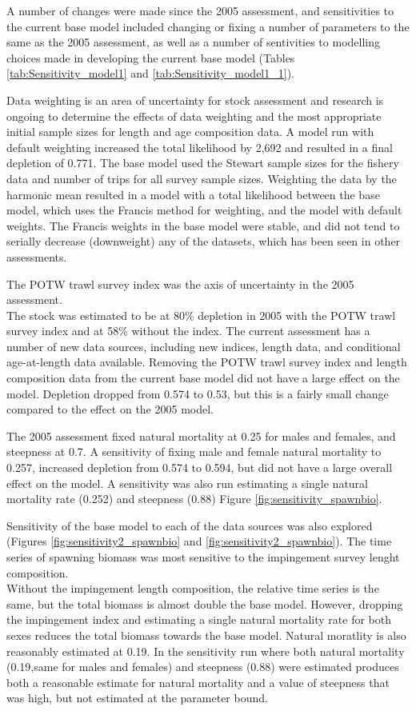 \documentclass[12pt,]{article}
\begin{document}
A number of changes were made since the 2005 assessment, and
sensitivities to the current base model included changing or fixing a
number of parameters to the same as the 2005 assessment, as well as a
number of sentivities to modelling choices made in developing the
current base model (Tables \ref{tab:Sensitivity_model1} and
\ref{tab:Sensitivity_model1_1}).

Data weighting is an area of uncertainty for stock assessment and
research is ongoing to determine the effects of data weighting and the
most appropriate initial sample sizes for length and age composition
data. A model run with default weighting increased the total likelihood
by 2,692 and resulted in a final depletion of 0.771. The base model used
the Stewart sample sizes for the fishery data and number of trips for
all survey sample sizes. Weighting the data by the harmonic mean
resulted in a model with a total likelihood between the base model,
which uses the Francis method for weighting, and the model with default
weights. The Francis weights in the base model were stable, and did not
tend to serially decrease (downweight) any of the datasets, which has
been seen in other assessments.

The POTW trawl survey index was the axis of uncertainty in the 2005
assessment.\\
The stock was estimated to be at 80\% depletion in 2005 with the POTW
trawl survey index and at 58\% without the index. The current assessment
has a number of new data sources, including new indices, length data,
and conditional age-at-length data available. Removing the POTW trawl
survey index and length composition data from the current base model did
not have a large effect on the model. Depletion dropped from 0.574 to
0.53, but this is a fairly small change compared to the effect on the
2005 model.

The 2005 assessment fixed natural mortality at 0.25 for males and
females, and steepness at 0.7. A sensitivity of fixing male and female
natural mortality to 0.257, increased depletion from 0.574 to 0.594, but
did not have a large overall effect on the model. A sensitivity was also
run estimating a single natural mortality rate (0.252) and steepness
(0.88) Figure \ref{fig:sensitivity_spawnbio}.

Sensitivity of the base model to each of the data sources was also
explored (Figures \ref{fig:sensitivity2_spawnbio} and
\ref{fig:sensitivity2_spawnbio}). The time series of spawning biomass
was most sensitive to the impingement survey lenght composition.\\
Without the impingement length composition, the relative time series is
the same, but the total biomass is almost double the base model.
However, dropping the impingement index and estimating a single natural
mortality rate for both sexes reduces the total biomass towards the base
model. Natural moratlity is also reasonably estimated at 0.19. In the
sensitivity run where both natural mortality (0.19,same for males and
females) and steepness (0.88) were estimated produces both a reasonable
estimate for natural mortality and a value of steepness that was high,
but not estimated at the parameter bound.
\end{document}
